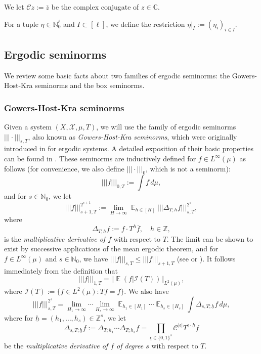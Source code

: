\documentclass[11pt]{amsart}
\theoremstyle{definition}
\newcommand{\C}{{\mathbb C}}
\newcommand{\N}{{\mathbb N}}
\newcommand{\Z}{{\mathbb Z}}
\newcommand{\CC}{{\mathcal C}}
\newcommand{\CI}{{\mathcal I}}
\newcommand{\CX}{{\mathcal X}}
\newcommand{\uh}{{\underline{h}}}
\newcommand{\ueps}{{\underline{\epsilon}}}
\newcommand{\norm}[1]{\left\Vert #1\right\Vert}
\newcommand{\nnorm}[1]{\lvert\!|\!| #1|\!|\!\rvert}
\DeclareMathOperator*{\E}{\mathbb{E}}
\begin{document}
We let $\CC z := \overline{z}$ be the complex conjugate of $z\in \C$.

For a tuple $\eta\in \N_0^\ell$ and $I\subset[\ell]$, we define the restriction $\eta|_I := (\eta_i)_{i\in I}$.

\subsection{Ergodic seminorms}\label{SS:seminorms}
We review some basic facts about two families of ergodic seminorms: the Gowers-Host-Kra  seminorms and the box seminorms.
\subsubsection{Gowers-Host-Kra seminorms}
Given a system $(X, \CX, \mu,T)$, we will use the family of ergodic seminorms $\nnorm{\cdot}_{s, T}$,  also known as \emph{Gowers-Host-Kra seminorms}, which were originally introduced in  \cite{HK05a} for ergodic systems. A detailed exposition of their basic properties can be found in  \cite[Chapter~8]{HK18}.
These seminorms are inductively defined for  $f\in L^\infty(\mu)$ as follows (for convenience, we also define $\nnorm{\cdot}_0$, which is   not a seminorm):
$$
\nnorm{f}_{0,T}:=\int f\, d\mu,
$$
and for $s\in \N_0$, we let
\begin{equation*}%
	\nnorm{f}_{s+1,T}^{2^{s+1}}:=\lim_{H\to\infty}\E_{h\in [H]} \nnorm{\Delta_{T; h}f}_{s,T}^{2^{s}},
\end{equation*}
where
$$
\Delta_{T;h}f:=f\cdot T^h\overline{f}, \quad h\in \Z,
$$
is the \emph{multiplicative derivative of $f$}  with respect to $T$.
The limit can be shown to exist by successive applications of the mean ergodic theorem, and for $f\in L^\infty(\mu)$ and $s\in \N_0$, we have $\nnorm{f}_{s,T}\leq \nnorm{f}_{s+1,T}$ (see \cite{HK05a} or  \cite[Chapter~8]{HK18}).
It follows immediately from the definition that
$$
\nnorm{f}_{1,T}=\norm{\E(f|\CI(T))}_{L^2(\mu)},
$$
where $\CI(T):=\{f\in L^2(\mu)\colon Tf=f\}$. We also have
\begin{equation}\label{E:seminorm2}
	\nnorm{f}_{s,T}^{2^s}=\lim_{H_1\to\infty}\cdots \lim_{H_s\to\infty}\E_{h_1\in [H_1]}\cdots \E_{h_s\in [H_s]} \int \Delta_{s, T; \uh}f\, d\mu,
\end{equation}
where  for $\uh=(h_1,\ldots, h_s)\in \Z^s$, we let
$$
\Delta_{s,T;\uh}f:=\Delta_{T;h_1}\cdots \Delta_{T;h_s}f=\prod_{\ueps\in \{0,1\}^s}\mathcal{C}^{|\ueps|}T^{\ueps\cdot \uh}f
$$
be the \emph{multiplicative derivative of $f$ of degree $s$} with respect to $T$.
\end{document}
